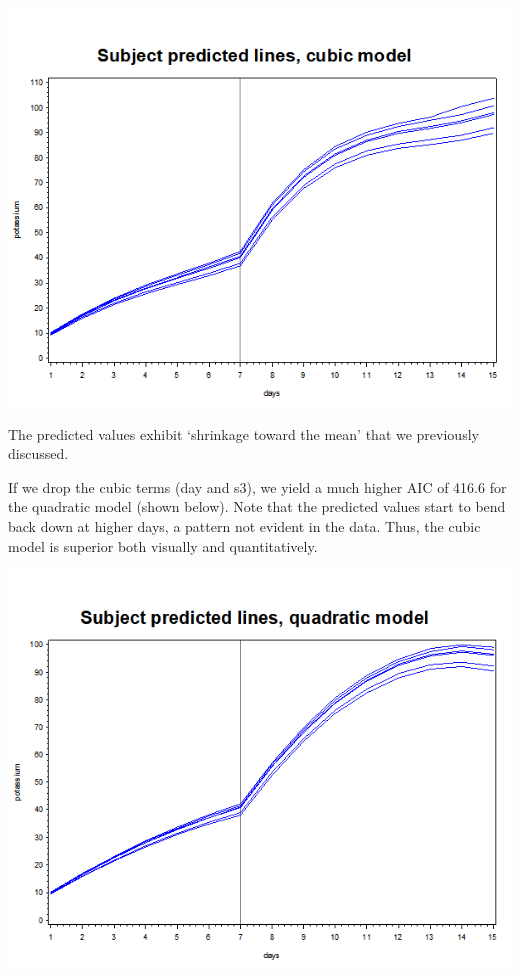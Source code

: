 \documentclass[
  9pt,
  ignorenonframetext,
]{beamer}
\begin{document}
\begin{frame}{}
\protect\hypertarget{section-7}{}
\begin{center}\includegraphics[width=0.7\linewidth]{figs_L12/f11} \end{center}

The predicted values exhibit `shrinkage toward the mean' that we
previously discussed.
\end{frame}

\begin{frame}{}
\protect\hypertarget{section-8}{}
If we drop the cubic terms (day and s3), we yield a much higher AIC of
416.6 for the quadratic model (shown below). Note that the predicted
values start to bend back down at higher days, a pattern not evident in
the data. Thus, the cubic model is superior both visually and
quantitatively.

\begin{center}\includegraphics[width=0.7\linewidth]{figs_L12/f12} \end{center}
\end{frame}
\end{document}

